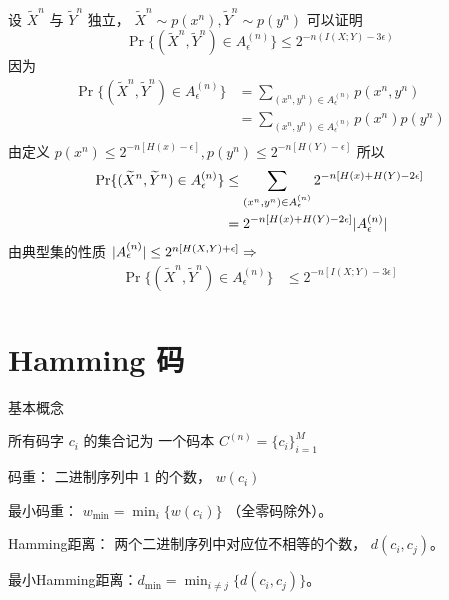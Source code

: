 \documentclass{article}
\DeclarePairedDelimiter\abs{\lvert}{\rvert}
\begin{document}
设 $\widetilde{X}^n$ 与 $\widetilde{Y}^n $ 独立，
$
\widetilde{X}^n \sim p(x^n), \widetilde{Y}^n \sim p(y^n) 
$
可以证明 
$$
 \Pr\{ (\widetilde{X}^n, \widetilde{Y}^n) \in A_{\epsilon}^{(n)}\} \leq  2^{-n (I(X;Y) - 3 \epsilon)} 
$$
因为
\begin{align*}
 \Pr\{ (\widetilde{X}^n, \widetilde{Y}^n) \in A_{\epsilon}^{(n)}\} & = 
\sum_{(x^n, y^n) \in A_{\epsilon}^{(n)}} p(x^n, y^n) \\
 & = 
\sum_{(x^n, y^n) \in A_{\epsilon}^{(n)}} p(x^n)p(y^n) \\
\end{align*}
由定义 $ p(x^n) \leq 2^{-n [H(x) - \epsilon]}, p(y^n) \leq 2^{-n [H(Y) - \epsilon]}$
所以
\begin{align*}
 \Pr\{ (\widetilde{X}^n, \widetilde{Y}^n) \in A_{\epsilon}^{(n)}\}  & \leq 
\sum_{(x^n, y^n) \in A_{\epsilon}^{(n)}}2^{-n [H(x)+H(Y) - 2\epsilon]}  \\
& = 2^{-n [H(x)+H(Y) - 2\epsilon]} \abs{A_{\epsilon}^{(n)}}
\end{align*}
由典型集的性质 $\abs{A_{\epsilon}^{(n)}} \leq 2^{n [H(X,Y) + \epsilon]} \Rightarrow$
\begin{align*}
 \Pr\{ (\widetilde{X}^n, \widetilde{Y}^n) \in A_{\epsilon}^{(n)}\}  & \leq 
2^{-n [ I(X; Y)-3\epsilon]} \\
\end{align*}
\section{Hamming 码}
基本概念

所有码字 $c_i$ 的集合记为 一个码本 $C^{(n)} = \{ c_i \}_{i=1}^M $

码重： 二进制序列中 1 的个数， $ w(c_i) $

最小码重： $ w_{\min} = \min_{i} \{ w(c_i) \} $ （全零码除外）。

Hamming距离： 两个二进制序列中对应位不相等的个数， $ d(c_i, c_j ) $。

最小Hamming距离：$ d_{\min} = \min_{ i \neq j } \{ d(c_i, c_j) \} $。
\end{document}
